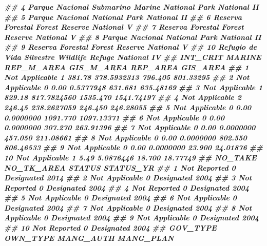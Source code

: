 \documentclass[10pt,landscape,a3paper]{article}
\newenvironment{Shaded}{\begin{snugshade}}{\end{snugshade}}
\newcommand{\DocumentationTok}[1]{\textcolor[rgb]{0.56,0.35,0.01}{\textbf{\textit{#1}}}}
\begin{document}
\begin{Shaded}
\begin{Highlighting}[]
\DocumentationTok{\#\# 4  Parque Nacional Submarino Marine National Park   National       II}
\DocumentationTok{\#\# 5            Parque Nacional        National Park   National       II}
\DocumentationTok{\#\# 6           Reserva Forestal       Forest Reserve   National        V}
\DocumentationTok{\#\# 7           Reserva Forestal       Forest Reserve   National        V}
\DocumentationTok{\#\# 8            Parque Nacional        National Park   National       II}
\DocumentationTok{\#\# 9           Reserva Forestal       Forest Reserve   National        V}
\DocumentationTok{\#\# 10 Refugio de Vida Silvestre      Wildlife Refuge   National       IV}
\DocumentationTok{\#\#          INT\_CRIT MARINE REP\_M\_AREA  GIS\_M\_AREA REP\_AREA   GIS\_AREA}
\DocumentationTok{\#\# 1  Not Applicable      1     381.78 378.5932313  796.405  801.33295}
\DocumentationTok{\#\# 2  Not Applicable      0       0.00   0.5377948  631.681  635.48169}
\DocumentationTok{\#\# 3  Not Applicable      1     829.18 817.7824560 1535.470 1541.74197}
\DocumentationTok{\#\# 4  Not Applicable      2     246.45 238.2627059  246.450  246.28055}
\DocumentationTok{\#\# 5  Not Applicable      0       0.00   0.0000000 1091.770 1097.13371}
\DocumentationTok{\#\# 6  Not Applicable      0       0.00   0.0000000  307.270  263.91396}
\DocumentationTok{\#\# 7  Not Applicable      0       0.00   0.0000000  457.050  211.08661}
\DocumentationTok{\#\# 8  Not Applicable      0       0.00   0.0000000  802.550  806.46533}
\DocumentationTok{\#\# 9  Not Applicable      0       0.00   0.0000000   23.900   24.01876}
\DocumentationTok{\#\# 10 Not Applicable      1       5.49   5.0876446   18.700   18.77749}
\DocumentationTok{\#\#           NO\_TAKE NO\_TK\_AREA     STATUS STATUS\_YR}
\DocumentationTok{\#\# 1    Not Reported          0 Designated      2014}
\DocumentationTok{\#\# 2  Not Applicable          0 Designated      2004}
\DocumentationTok{\#\# 3    Not Reported          0 Designated      2004}
\DocumentationTok{\#\# 4    Not Reported          0 Designated      2004}
\DocumentationTok{\#\# 5  Not Applicable          0 Designated      2004}
\DocumentationTok{\#\# 6  Not Applicable          0 Designated      2004}
\DocumentationTok{\#\# 7  Not Applicable          0 Designated      2004}
\DocumentationTok{\#\# 8  Not Applicable          0 Designated      2004}
\DocumentationTok{\#\# 9  Not Applicable          0 Designated      2004}
\DocumentationTok{\#\# 10   Not Reported          0 Designated      2004}
\DocumentationTok{\#\#                                  GOV\_TYPE     OWN\_TYPE    MANG\_AUTH MANG\_PLAN}

\end{Highlighting}
\end{Shaded}
\end{document}
